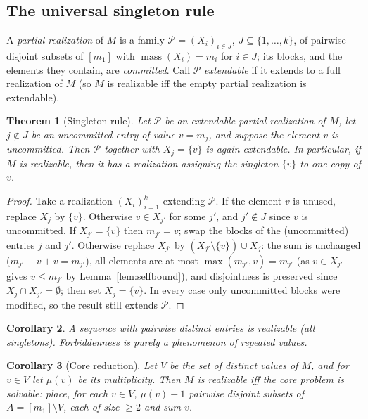 \documentclass[11pt]{article}
\newtheorem{theorem}{Theorem}[section]
\newtheorem{corollary}[theorem]{Corollary}
\theoremstyle{definition}
\theoremstyle{remark}
\newcommand{\mass}{\operatorname{mass}}
\newcommand{\intv}[1]{[#1]}
\begin{document}
\subsection{The universal singleton rule}

A \emph{partial realization} of $M$ is a family $\mathcal{P}=(X_i)_{i\in J}$,
$J\subseteq\{1,\dots,k\}$, of pairwise disjoint subsets of $\intv{m_1}$ with
$\mass(X_i)=m_i$ for $i\in J$; its blocks, and the elements they contain, are
\emph{committed}. Call $\mathcal{P}$ \emph{extendable} if it extends to a full
realization of $M$ (so $M$ is realizable iff the empty partial realization is
extendable).

\begin{theorem}[Singleton rule]\label{thm:singleton}
Let $\mathcal{P}$ be an extendable partial realization of $M$, let $j\notin J$ be an
uncommitted entry of value $v=m_j$, and suppose the element $v$ is uncommitted. Then
$\mathcal{P}$ together with $X_j=\{v\}$ is again extendable. In particular, if $M$ is
realizable, then it has a realization assigning the singleton $\{v\}$ to one copy of
$v$.
\end{theorem}

\begin{proof}
Take a realization $(X_i)_{i=1}^{k}$ extending $\mathcal{P}$. If the element $v$ is
unused, replace $X_j$ by $\{v\}$. Otherwise $v\in X_{j'}$ for some $j'$, and
$j'\notin J$ since $v$ is uncommitted. If $X_{j'}=\{v\}$ then $m_{j'}=v$; swap the
blocks of the (uncommitted) entries $j$ and $j'$. Otherwise replace $X_{j'}$ by
$(X_{j'}\setminus\{v\})\cup X_j$: the sum is unchanged ($m_{j'}-v+v=m_{j'}$), all
elements are at most $\max(m_{j'},v)=m_{j'}$ (as $v\in X_{j'}$ gives $v\le m_{j'}$ by
Lemma~\ref{lem:selfbound}), and disjointness is preserved since
$X_j\cap X_{j'}=\emptyset$; then set $X_j=\{v\}$. In every case only uncommitted
blocks were modified, so the result still extends $\mathcal{P}$.
\end{proof}

\begin{corollary}\label{cor:distinct}
A sequence with pairwise distinct entries is realizable (all singletons).
Forbiddenness is purely a phenomenon of repeated values.
\end{corollary}

\begin{corollary}[Core reduction]\label{cor:core}
Let $V$ be the set of distinct values of $M$, and for $v\in V$ let $\mu(v)$ be its
multiplicity. Then $M$ is realizable iff the \emph{core} problem is solvable: place,
for each $v\in V$, $\mu(v)-1$ pairwise disjoint subsets of
$A=\intv{m_1}\setminus V$, each of size $\ge2$ and sum $v$.
\end{corollary}
\end{document}
